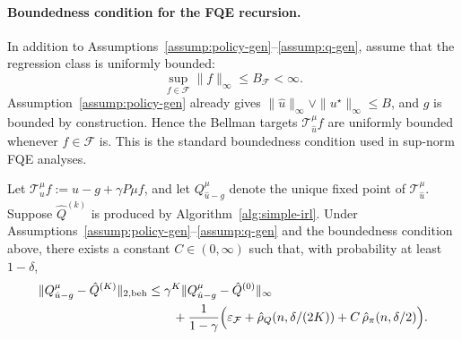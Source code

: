 
\paragraph{Boundedness condition for the FQE recursion.}
In addition to Assumptions~\ref{assump:policy-gen}--\ref{assump:q-gen},
assume that the regression class is uniformly bounded:
\[
\sup_{f\in\mathcal F}\|f\|_\infty \le B_{\mathcal F}<\infty.
\]
Assumption~\ref{assump:policy-gen} already gives
\(\|\hat u\|_\infty \vee \|u^\star\|_\infty \le B\), and \(g\) is bounded by
construction. Hence the Bellman targets \(\mathcal T^\mu_{\hat u}f\) are
uniformly bounded whenever \(f\in\mathcal F\) is. This is the standard
boundedness condition used in sup-norm FQE analyses.

\begin{lemma}
\label{lem:fqe-bound}
Let \(\mathcal T^\mu_u f := u-g+\gamma P\mu f\), and let
\(Q^\mu_{\hat u-g}\) denote the unique fixed point of
\(\mathcal T^\mu_{\hat u}\). Suppose \(\hat Q^{(k)}\) is produced by
Algorithm~\ref{alg:simple-irl}. Under
Assumptions~\ref{assump:policy-gen}--\ref{assump:q-gen} and the boundedness
condition above, there exists a constant \(C\in(0,\infty)\) such that, with
probability at least \(1-\delta\),
\begin{align*}
\|Q^\mu_{\hat u-g}-\hat Q^{(K)}\|_{2,\mathrm{beh}}
&\le
\gamma^K\|Q^\mu_{\hat u-g}-\hat Q^{(0)}\|_{\infty}\\
&\qquad+
\frac{1}{1-\gamma}
\Bigl(
\varepsilon_{\mathcal F}
+\hat\rho_Q(n,\delta/(2K))
+ C\,\hat\rho_\pi(n,\delta/2)
\Bigr).
\end{align*}
\end{lemma}

